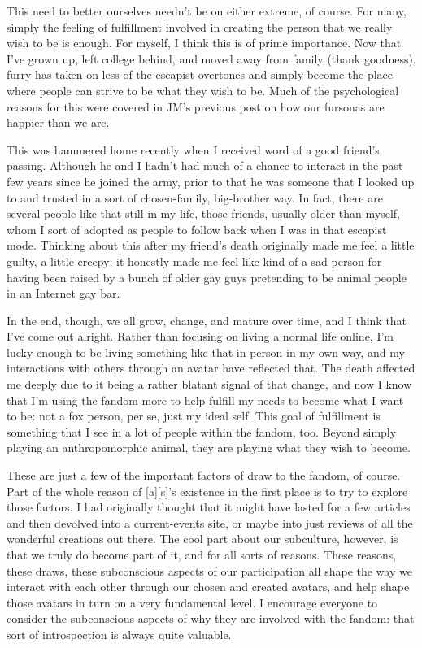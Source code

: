 This need to better ourselves needn't be on either extreme, of course.  For many, simply the feeling of fulfillment involved in creating the person that we really wish to be is enough.  For myself, I think this is of prime importance. Now that I've grown up, left college behind, and moved away from family (thank goodness), furry has taken on less of the escapist overtones and simply become the place where people can strive to be what they wish to be.  Much of the psychological reasons for this were covered in JM's previous post on how our fursonas are happier than we are.

This was hammered home recently when I received word of a good friend's passing. Although he and I hadn't had much of a chance to interact in the past few years since he joined the army, prior to that he was someone that I looked up to and trusted in a sort of chosen-family, big-brother way.  In fact, there are several people like that still in my life, those friends, usually older than myself, whom I sort of adopted as people to follow back when I was in that escapist mode. Thinking about this after my friend's death originally made me feel a little guilty, a little creepy; it honestly made me feel like kind of a sad person for having been raised by a bunch of older gay guys pretending to be animal people in an Internet gay bar.

In the end, though, we all grow, change, and mature over time, and I think that I've come out alright. Rather than focusing on living a normal life online, I'm lucky enough to be living something like that in person in my own way, and my interactions with others through an avatar have reflected that. The death affected me deeply due to it being a rather blatant signal of that change, and now I know that I'm using the fandom more to help fulfill my needs to become what I want to be: not a fox person, per se, just my ideal self.  This goal of fulfillment is something that I see in a lot of people within the fandom, too. Beyond simply playing an anthropomorphic animal, they are playing what they wish to become.

These are just a few of the important factors of draw to the fandom, of course.  Part of the whole reason of [a][s]'s existence in the first place is to try to explore those factors.  I had originally thought that it might have lasted for a few articles and then devolved into a current-events site, or maybe into just reviews of all the wonderful creations out there. The cool part about our subculture, however, is that we truly do become part of it, and for all sorts of reasons. These reasons, these draws, these subconscious aspects of our participation all shape the way we interact with each other through our chosen and created avatars, and help shape those avatars in turn on a very fundamental level. I encourage everyone to consider the subconscious aspects of why they are involved with the fandom: that sort of introspection is always quite valuable.
